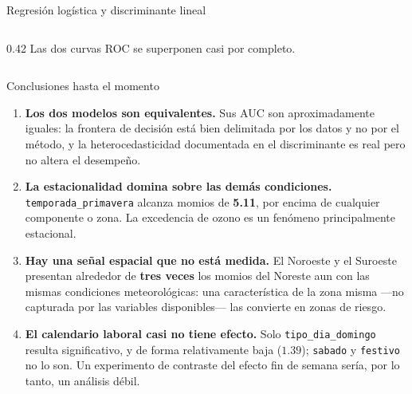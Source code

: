 \documentclass{beamer}
\begin{document}
\begin{frame}{Regresión logística y discriminante lineal}
\begin{columns}[T]
\begin{column}{0.42\textwidth}
      \scriptsize Las dos curvas ROC se superponen casi por completo.
    \end{column}
  \end{columns}
\end{frame}

\begin{frame}{Conclusiones hasta el momento}
  \footnotesize

  \begin{enumerate}[label=\textbf{\roman*.},itemsep=3pt,topsep=0pt,parsep=0pt,leftmargin=*]
    \item \textbf{Los dos modelos son equivalentes.} Sus AUC son
      aproximadamente iguales: la frontera de decisión está bien delimitada
      por los datos y no por el método, y la heterocedasticidad documentada
      en el discriminante es real pero no altera el desempeño.

    \item \textbf{La estacionalidad domina sobre las demás condiciones.}
      \texttt{temporada\_primavera} alcanza momios de \textbf{5.11},
      por encima de cualquier componente o zona. La excedencia de ozono es
      un fenómeno principalmente estacional.

    \item \textbf{Hay una señal espacial que no está medida.} El Noroeste y
      el Suroeste presentan alrededor de \textbf{tres veces} los momios del
      Noreste aun con las mismas condiciones meteorológicas: una
      característica de la zona misma ---no capturada por las variables
      disponibles--- las convierte en zonas de riesgo.

    \item \textbf{El calendario laboral casi no tiene efecto.} Solo
      \texttt{tipo\_dia\_domingo} resulta significativo, y de forma
      relativamente baja ($1.39$); \texttt{sabado} y \texttt{festivo} no lo
      son. Un experimento de contraste del efecto fin de semana sería, por
      lo tanto, un análisis débil.
  \end{enumerate}
\end{frame}
\end{document}
